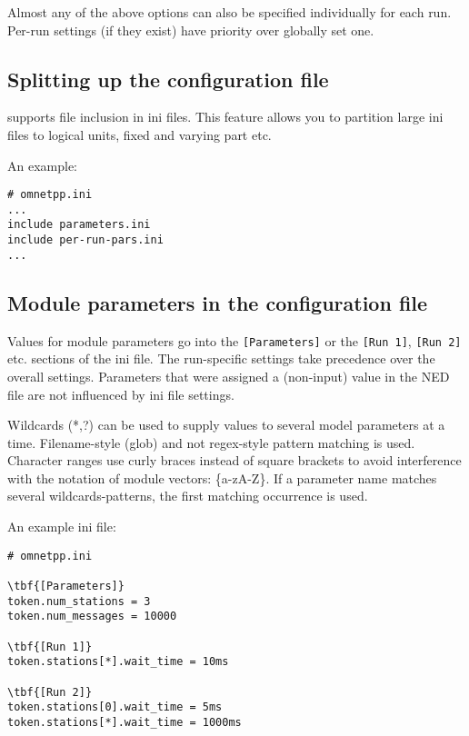 Almost any of the above options can also be specified individually 
for each run. Per-run settings (if they exist) have priority 
over globally set one.





\subsection{Splitting up the configuration file}

{\opp} supports file inclusion in ini files. This feature allows you to partition large ini files to
logical units, fixed and varying part etc.

An example:

\begin{Verbatim}
# omnetpp.ini
...
include parameters.ini
include per-run-pars.ini
...
\end{Verbatim}




\subsection{Module parameters in the configuration file}

Values for module parameters go into the \texttt{[Parameters]} or the
\texttt{[Run 1]}, \texttt{[Run 2]} etc. sections of the ini file. The
run-specific settings take precedence over the overall settings.
Parameters that were assigned a (non-input) value in the NED file are
not influenced by ini file settings.

Wildcards (*,?) can be used to supply values
to several model parameters at a time. Filename-style (glob) and not
regex-style pattern matching is used. Character ranges use curly
braces instead of square brackets to avoid interference with the
notation of module vectors: \{a-zA-Z\}. If a parameter name matches
several wildcards-patterns, the first matching occurrence is used.


An example ini file:

\begin{Verbatim}[commandchars=\\\{\}]
# omnetpp.ini

\tbf{[Parameters]}
token.num_stations = 3
token.num_messages = 10000

\tbf{[Run 1]}
token.stations[*].wait_time = 10ms

\tbf{[Run 2]}
token.stations[0].wait_time = 5ms
token.stations[*].wait_time = 1000ms
\end{Verbatim}







